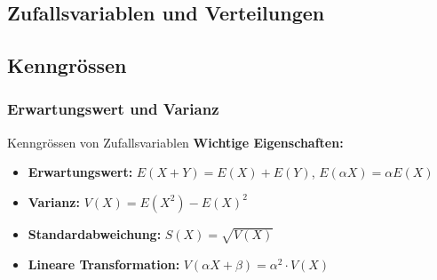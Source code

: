 \subsection{Zufallsvariablen und Verteilungen}
\subsection{Kenngrössen}

\subsubsection{Erwartungswert und Varianz}

\begin{concept}{Kenngrössen von Zufallsvariablen}
\textbf{Wichtige Eigenschaften:}
\begin{itemize}
    \item \textbf{Erwartungswert:} $E(X + Y) = E(X) + E(Y)$, $E(\alpha X) = \alpha E(X)$
    \item \textbf{Varianz:} $V(X) = E(X^2) - E(X)^2$
    \item \textbf{Standardabweichung:} $S(X) = \sqrt{V(X)}$
    \item \textbf{Lineare Transformation:} $V(\alpha X + \beta) = \alpha^2 \cdot V(X)$
\end{itemize}
\end{concept}

